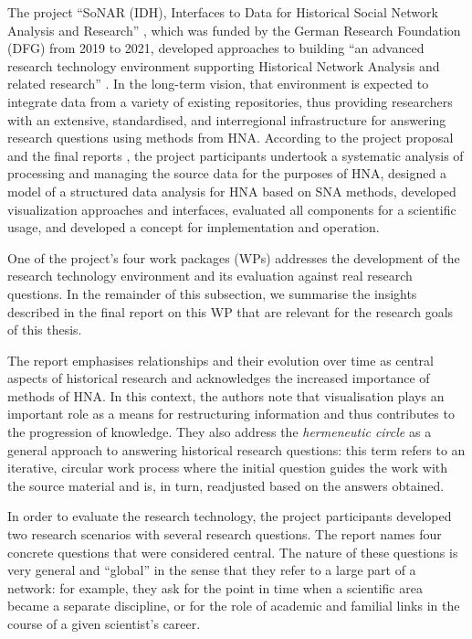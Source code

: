 The project \enquote{SoNAR (IDH),
Interfaces to Data for Historical Social Network Analysis
and Research} \autocite{Bludau2020,Menzel2020,SoNAR},
which was funded by the German Research Foundation (DFG)
from 2019 to 2021,
developed approaches to building 
\enquote{an advanced research technology environment
supporting Historical Network Analysis and related research} \autocite{SoNAR}.
In the long-term vision, that environment is expected to
integrate data from a variety of existing repositories,
thus providing researchers with an extensive,
standardised, and interregional infrastructure for answering research questions
using methods from \gls{HNA}.
According to the project proposal and the final reports \autocite{SoNARreports},
the project participants undertook
a systematic analysis of processing and managing the source data
for the purposes of \gls{HNA},
designed a model of a structured data analysis for \gls{HNA} based on \gls{SNA} methods,
developed visualization approaches and interfaces,
evaluated all components for a scientific usage,
and developed a concept for implementation and operation.

One of the project's four work packages (WPs)
addresses the development of the research technology environment
and its evaluation against real research questions.
In the remainder of this subsection,
we summarise the insights described in the final report on this WP \autocite{Fangerau2022}
that are relevant for the research goals of this thesis.

The report emphasises relationships and their evolution over time
as central aspects of historical research and acknowledges the increased 
importance of methods of \gls{HNA}. In this context, the authors note that visualisation plays an important role
as a means for restructuring information and thus contributes to the progression of knowledge.
They also address the \emph{hermeneutic circle} \autocite{Malpas2015}
as a general approach to answering historical research questions:
this term refers to an iterative, circular work process
where the initial question guides the work with the source material
and is, in turn, readjusted based on the answers obtained.

In order to evaluate the research technology,
the project participants developed two research scenarios
with several research questions.
The report names four concrete questions that were considered central.
The nature of these questions is very general and \enquote{global}
in the sense that they refer to a large part of a network:
for example, they ask for the point in time when a scientific area became a separate discipline,
or for the role of academic and familial links in the course of a given scientist's career.

